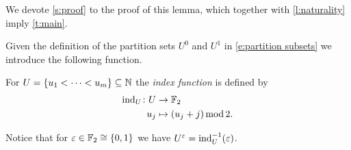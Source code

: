 We devote \cref{s:proof} to the proof of this lemma, which together with \cref{l:naturality} imply \cref{t:main}.

Given the definition of the partition sets $U^0$ and $U^1$ in \eqref{e:partition subsets} we introduce the following function.
\begin{definition} \label{d:index function}
	For $U = \{u_1 < \cdots < u_m\} \subseteq \mathbb{N}$ the \textit{index function} is defined by
	\[
	\begin{split}
	\mathrm{ind}_U \colon U & \to {\mathbb{F}_2} \\
	u_j & \mapsto (u_j + j) \operatorname{mod} 2.
	\end{split}
	\]
\end{definition}

Notice that for $\varepsilon \in {\mathbb{F}_2} \cong \{0,1\}$ we have $U^\varepsilon = \mathrm{ind}_U^{-1}(\varepsilon)$.